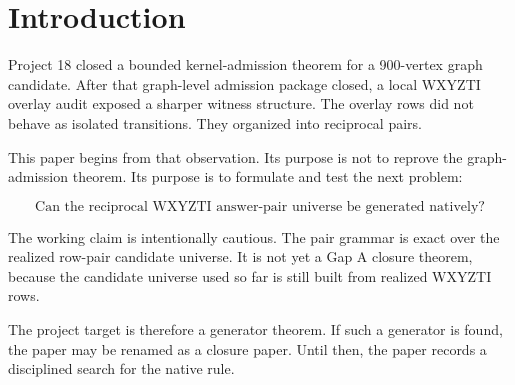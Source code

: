 \section{Introduction}

Project 18 closed a bounded kernel-admission theorem for a 900-vertex graph candidate. After that graph-level admission package closed, a local WXYZTI overlay audit exposed a sharper witness structure. The overlay rows did not behave as isolated transitions. They organized into reciprocal pairs.

This paper begins from that observation. Its purpose is not to reprove the graph-admission theorem. Its purpose is to formulate and test the next problem:

\[
\text{Can the reciprocal WXYZTI answer-pair universe be generated natively?}
\]

The working claim is intentionally cautious. The pair grammar is exact over the realized row-pair candidate universe. It is not yet a Gap A closure theorem, because the candidate universe used so far is still built from realized WXYZTI rows.

The project target is therefore a generator theorem. If such a generator is found, the paper may be renamed as a closure paper. Until then, the paper records a disciplined search for the native rule.

